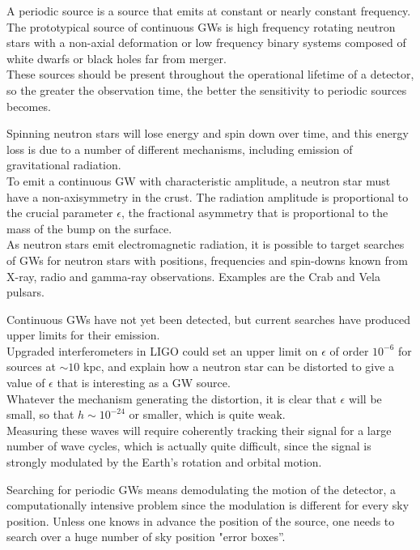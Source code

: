 \documentclass[binding=0.6cm, LaM]{sapthesis}
\begin{document}
	A periodic source is a source that emits at constant or nearly constant frequency.
	The prototypical source of continuous GWs is high frequency rotating neutron stars 
	with a non-axial deformation or low frequency binary systems 
	composed of white dwarfs or black holes far from merger. \\
	These sources should be present throughout the operational lifetime of a detector, 
	so the greater the observation time, the better the sensitivity to periodic sources becomes. 

	Spinning neutron stars will lose energy and spin down over time, 
	and this energy loss is due to a number of different mechanisms, 
	including emission of gravitational radiation. \\
	To emit a continuous GW with characteristic amplitude, 
	a neutron star must have a non-axisymmetry in the crust. 
	The radiation amplitude is proportional to the crucial parameter $\epsilon$, 
	the fractional asymmetry that is proportional to the mass of the bump on the surface.\\
	As neutron stars emit electromagnetic radiation, 
	it is possible to target searches of GWs for neutron stars with positions, 
	frequencies and spin-downs known from X-ray, radio and gamma-ray observations. 
	Examples are the Crab and Vela pulsars. 

	Continuous GWs have not yet been detected, 
	but current searches have produced upper limits for their emission. \\
	Upgraded interferometers in LIGO could set an upper limit on  
	$\epsilon$ of order $10^{-6}$ for sources at $\sim10$ kpc, 
	and explain how a neutron star can be distorted to give a value of $\epsilon$ that is interesting as a GW source. \\
	Whatever the mechanism generating the distortion, 
	it is clear that  $\epsilon$ will be small,
	so that $h \sim 10^{-24}$ or smaller, which is quite weak. \\
	Measuring these waves will require
	coherently tracking their signal for a large number of wave cycles, 
	which is actually quite difficult, 
	since the signal is strongly modulated by the Earth’s rotation and orbital motion.

	Searching for periodic GWs means demodulating the motion of the detector, 
	a computationally intensive problem since the modulation is different for every sky position. 
	Unless one knows in advance the position of the source, 
	one needs to search over a huge number of sky position "error boxes”.
\end{document}
